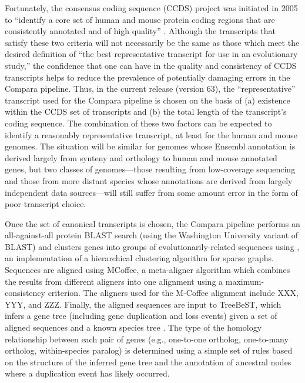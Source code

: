 Fortunately, the consensus coding sequence (CCDS) project was
initiated in 2005 to ``identify a core set of human and mouse protein
coding regions that are consistently annotated and of high quality''
\citep{Pruitt2009}. Although the transcripts that satisfy these two
criteria will not necessarily be the same as those which meet the
desired definition of ``the best representative transcript for use in
an evolutionary study,'' the confidence that one can have in the
quality and consistency of CCDS transcripts helps to reduce the
prevalence of potentially damaging errors in the Compara pipeline.
Thus, in the current release (version 63), the ``representative''
transcript used for the Compara pipeline is chosen on the basis of (a)
existence within the CCDS set of transcripts and (b) the total length
of the transcript's coding sequence. The combination of these two
factors can be expected to identify a reasonably representative
transcript, at least for the human and mouse genomes. The situation
will be similar for genomes whose Ensembl annotation is derived
largely from synteny and orthology to human and mouse annotated genes,
but two classes of genomes---those resulting from low-coverage
sequencing and those from more distant species whose annotations are
derived from largely independent data sources---will still suffer from
some amount error in the form of poor transcript choice.

Once the set of canonical transcripts is chosen, the Compara pipeline
performs an all-against-all protein BLAST search (using the Washington
University variant of BLAST) and clusters genes into groups of
evolutionarily-related sequences using \hclust, an
implementation of a hierarchical clustering algorithm for sparse
graphs. Sequences are aligned using MCoffee, a meta-aligner algorithm
which combines the results from different aligners into one alignment
using a maximum-consistency criterion. The aligners used for the
M-Coffee alignment include XXX, YYY, and ZZZ. Finally, the aligned
sequences are input to TreeBeST, which infers a gene tree (including
gene duplication and loss events) given a set of aligned sequences and
a known species tree \citep{Ruan2008}. The type of the homology
relationship between each pair of genes (e.g., one-to-one ortholog,
one-to-many ortholog, within-species paralog) is determined using a
simple set of rules based on the structure of the inferred gene tree
and the annotation of ancestral nodes where a duplication event has
likely occurred.


